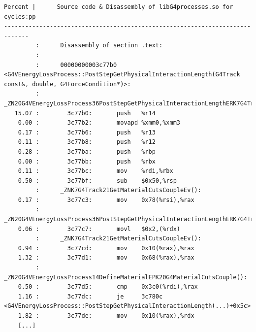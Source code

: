 \documentclass[a4paper]{jpconf}
\begin{document}
\begin{appendices}
\begin{minipage}{\linewidth}
\begin{lstlisting}[language={[x64]Assembler}, basicstyle=\ttfamily\tiny,
caption=G4VEnergyLossProcess::PostStepGetPhysicalInteractionLength cycles annotation]
Percent |      Source code & Disassembly of libG4processes.so for  cycles:pp
-----------------------------------------------------------------------------
         :      Disassembly of section .text:
         :
         :      00000000003c77b0 <G4VEnergyLossProcess::PostStepGetPhysicalInteractionLength(G4Track const&, double, G4ForceCondition*)>:
         :      _ZN20G4VEnergyLossProcess36PostStepGetPhysicalInteractionLengthERK7G4TrackdP16G4ForceCondition():
   15.07 :        3c77b0:       push   %r14
    0.00 :        3c77b2:       movapd %xmm0,%xmm3
    0.17 :        3c77b6:       push   %r13
    0.11 :        3c77b8:       push   %r12
    0.28 :        3c77ba:       push   %rbp
    0.00 :        3c77bb:       push   %rbx
    0.11 :        3c77bc:       mov    %rdi,%rbx
    0.50 :        3c77bf:       sub    $0x50,%rsp
         :      _ZNK7G4Track21GetMaterialCutsCoupleEv():
    0.17 :        3c77c3:       mov    0x78(%rsi),%rax
         :      _ZN20G4VEnergyLossProcess36PostStepGetPhysicalInteractionLengthERK7G4TrackdP16G4ForceCondition():
    0.06 :        3c77c7:       movl   $0x2,(%rdx)
         :      _ZNK7G4Track21GetMaterialCutsCoupleEv():
    0.94 :        3c77cd:       mov    0x10(%rax),%rax
    1.32 :        3c77d1:       mov    0x68(%rax),%rax
         :      _ZN20G4VEnergyLossProcess14DefineMaterialEPK20G4MaterialCutsCouple():
    0.50 :        3c77d5:       cmp    0x3c0(%rdi),%rax
    1.16 :        3c77dc:       je     3c780c <G4VEnergyLossProcess::PostStepGetPhysicalInteractionLength(...)+0x5c>
    1.82 :        3c77de:       mov    0x10(%rax),%rdx
    [...]
\end{lstlisting}
\end{minipage}


\end{appendices}
\end{document}
